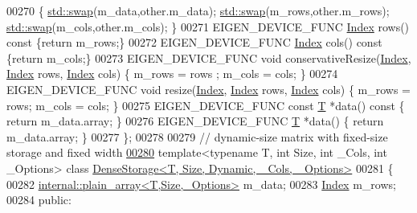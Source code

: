 \begin{DoxyCode}
00270     \{ \hyperlink{endian_8c_a3ca5ecd34b04d6a243c054ac3a57f68d}{std::swap}(m\_data,other.m\_data); \hyperlink{endian_8c_a3ca5ecd34b04d6a243c054ac3a57f68d}{std::swap}(m\_rows,other.m\_rows); 
      \hyperlink{endian_8c_a3ca5ecd34b04d6a243c054ac3a57f68d}{std::swap}(m\_cols,other.m\_cols); \}
00271     EIGEN\_DEVICE\_FUNC \hyperlink{namespace_eigen_a62e77e0933482dafde8fe197d9a2cfde}{Index} rows()\textcolor{keyword}{ const }\{\textcolor{keywordflow}{return} m\_rows;\}
00272     EIGEN\_DEVICE\_FUNC \hyperlink{namespace_eigen_a62e77e0933482dafde8fe197d9a2cfde}{Index} cols()\textcolor{keyword}{ const }\{\textcolor{keywordflow}{return} m\_cols;\}
00273     EIGEN\_DEVICE\_FUNC \textcolor{keywordtype}{void} conservativeResize(\hyperlink{namespace_eigen_a62e77e0933482dafde8fe197d9a2cfde}{Index}, \hyperlink{namespace_eigen_a62e77e0933482dafde8fe197d9a2cfde}{Index} rows, \hyperlink{namespace_eigen_a62e77e0933482dafde8fe197d9a2cfde}{Index} cols) \{ m\_rows = rows
      ; m\_cols = cols; \}
00274     EIGEN\_DEVICE\_FUNC \textcolor{keywordtype}{void} resize(\hyperlink{namespace_eigen_a62e77e0933482dafde8fe197d9a2cfde}{Index}, \hyperlink{namespace_eigen_a62e77e0933482dafde8fe197d9a2cfde}{Index} rows, \hyperlink{namespace_eigen_a62e77e0933482dafde8fe197d9a2cfde}{Index} cols) \{ m\_rows = rows; m\_cols = 
      cols; \}
00275     EIGEN\_DEVICE\_FUNC \textcolor{keyword}{const} \hyperlink{group___sparse_core___module_class_eigen_1_1_triplet}{T} *data()\textcolor{keyword}{ const }\{ \textcolor{keywordflow}{return} m\_data.array; \}
00276     EIGEN\_DEVICE\_FUNC \hyperlink{group___sparse_core___module_class_eigen_1_1_triplet}{T} *data() \{ \textcolor{keywordflow}{return} m\_data.array; \}
00277 \};
00278 
00279 \textcolor{comment}{// dynamic-size matrix with fixed-size storage and fixed width}
\hyperlink{class_eigen_1_1_dense_storage_3_01_t_00_01_size_00_01_dynamic_00_01___cols_00_01___options_01_4}{00280} \textcolor{keyword}{template}<\textcolor{keyword}{typename} T, \textcolor{keywordtype}{int} Size, \textcolor{keywordtype}{int} \_Cols, \textcolor{keywordtype}{int} \_Options> \textcolor{keyword}{class }
      \hyperlink{class_eigen_1_1_dense_storage_3_01_t_00_01_size_00_01_dynamic_00_01___cols_00_01___options_01_4}{DenseStorage<T, Size, Dynamic, \_Cols, \_Options>}
00281 \{
00282     \hyperlink{struct_eigen_1_1internal_1_1plain__array}{internal::plain\_array<T,Size,\_Options>} m\_data;
00283     \hyperlink{namespace_eigen_a62e77e0933482dafde8fe197d9a2cfde}{Index} m\_rows;
00284   \textcolor{keyword}{public}:

\end{DoxyCode}
